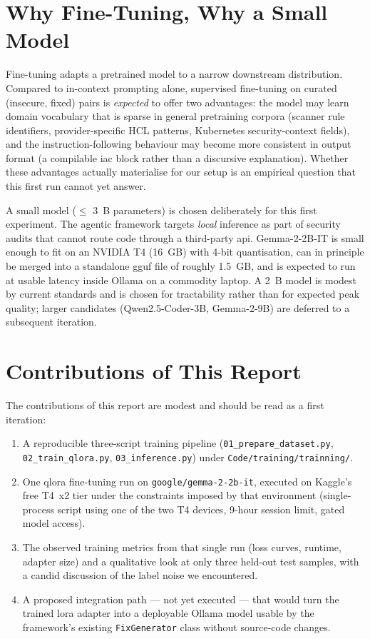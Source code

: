 \documentclass[12pt, a4paper]{report}
\begin{document}
\section{Why Fine-Tuning, Why a Small Model}

Fine-tuning adapts a pretrained model to a narrow downstream distribution.
Compared to in-context prompting alone, supervised fine-tuning on curated
(insecure, fixed) pairs is \emph{expected} to offer two advantages: the
model may learn domain vocabulary that is sparse in general pretraining
corpora (scanner rule identifiers, provider-specific HCL patterns,
Kubernetes security-context fields), and the instruction-following
behaviour may become more consistent in output format (a compilable
\gls{iac} block rather than a discursive explanation). Whether these
advantages actually materialise for our setup is an empirical question
that this first run cannot yet answer.

A small model (\(\leq\) 3~B parameters) is chosen deliberately for this
first experiment. The agentic framework targets \emph{local} inference as
part of security audits that cannot route code through a third-party
\gls{api}. Gemma-2-2B-IT is small enough to fit on an NVIDIA T4 (16~GB)
with 4-bit quantisation, can in principle be merged into a standalone
\gls{gguf} file of roughly 1.5~GB, and is expected to run at usable
latency inside Ollama on a commodity laptop. A 2~B model is modest by
current standards and is chosen for tractability rather than for expected
peak quality; larger candidates (Qwen2.5-Coder-3B, Gemma-2-9B) are
deferred to a subsequent iteration.

\section{Contributions of This Report}

The contributions of this report are modest and should be read as a
first iteration:

\begin{enumerate}
  \item A reproducible three-script training pipeline
        (\texttt{01\_prepare\_dataset.py}, \texttt{02\_train\_qlora.py},
         \texttt{03\_inference.py}) under
         \texttt{Code/training/trainning/}.
  \item One \gls{qlora} fine-tuning run on
        \texttt{google/gemma-2-2b-it}, executed on Kaggle's free
        T4~x2 tier under the constraints imposed by that environment
        (single-process script using one of the two T4 devices,
        9-hour session limit, gated model access).
  \item The observed training metrics from that single run (loss curves,
        runtime, adapter size) and a qualitative look at only three
        held-out test samples, with a candid discussion of the label
        noise we encountered.
  \item A proposed integration path --- not yet executed --- that would
        turn the trained \gls{lora} adapter into a deployable Ollama
        model usable by the framework's existing \texttt{FixGenerator}
        class without source-code changes.
\end{enumerate}
\end{document}
